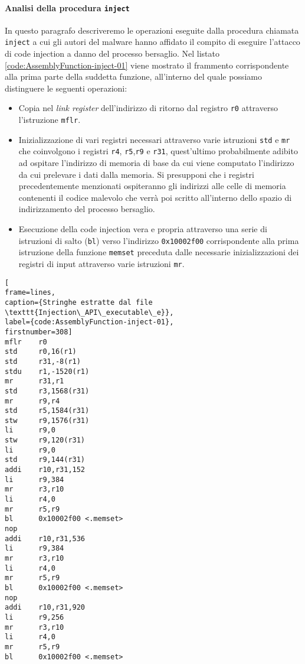 \documentclass[10pt,a4paper, titlepage]{report}
\begin{document}
\paragraph{Analisi della procedura \texttt{inject}}

In questo paragrafo descriveremo le operazioni eseguite dalla procedura chiamata \texttt{inject} a cui gli autori del malware hanno affidato il compito di eseguire l'attacco di code injection a danno del processo bersaglio.
Nel listato \ref{code:AssemblyFunction-inject-01} viene mostrato il frammento corrispondente alla prima parte della suddetta funzione, all'interno del quale possiamo distinguere le seguenti operazioni:
\begin{itemize}
\item Copia nel \textit{link register} dell'indirizzo di ritorno dal registro \texttt{r0} attraverso l'istruzione \texttt{mflr}.
\item Inizializzazione di vari registri necessari attraverso varie istruzioni \texttt{std} e \texttt{mr} che coinvolgono i registri \texttt{r4}, \texttt{r5},\texttt{r9} e  \texttt{r31}, quest'ultimo probabilmente adibito ad ospitare l'indirizzo di memoria di base da cui viene computato l'indirizzo da cui prelevare i dati dalla memoria. Si presupponi che i registri precedentemente menzionati ospiteranno gli indirizzi alle celle di memoria contenenti il codice malevolo che verrà poi scritto all'interno dello spazio di indirizzamento del processo bersaglio.
\item Esecuzione della code injection vera e propria attraverso una serie di istruzioni di salto (\texttt{bl}) verso l'indirizzo \texttt{0x10002f00} corrispondente alla prima istruzione della funzione \texttt{memset} preceduta dalle necessarie inizializzazioni dei registri di input attraverso varie istruzioni \texttt{mr}.
\end{itemize}

\begin{lstlisting}[
frame=lines, 
caption={Stringhe estratte dal file \texttt{Injection\_API\_executable\_e}}, 
label={code:AssemblyFunction-inject-01},
firstnumber=308]
mflr    r0
std     r0,16(r1)
std     r31,-8(r1)
stdu    r1,-1520(r1)
mr      r31,r1
std     r3,1568(r31)
mr      r9,r4
std     r5,1584(r31)
stw     r9,1576(r31)
li      r9,0
stw     r9,120(r31)
li      r9,0
std     r9,144(r31)
addi    r10,r31,152
li      r9,384
mr      r3,r10
li      r4,0
mr      r5,r9
bl      0x10002f00 <.memset>
nop
addi    r10,r31,536
li      r9,384
mr      r3,r10
li      r4,0
mr      r5,r9
bl      0x10002f00 <.memset>
nop
addi    r10,r31,920
li      r9,256
mr      r3,r10
li      r4,0
mr      r5,r9
bl      0x10002f00 <.memset>
\end{lstlisting}
\end{document}
